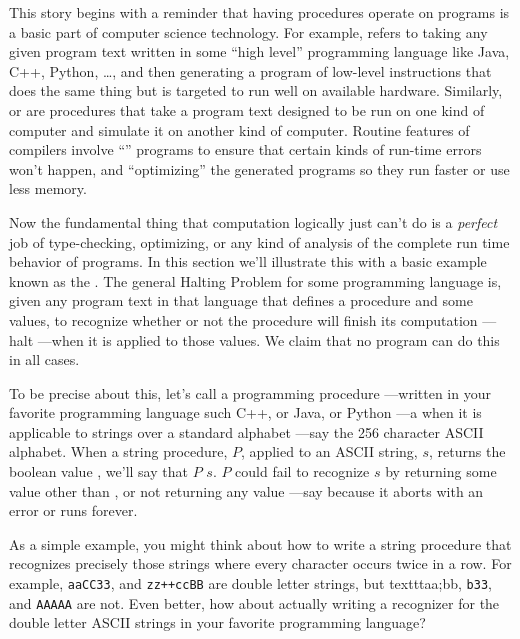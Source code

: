 This story begins with a reminder that having procedures operate on
programs is a basic part of computer science technology.  For example,
\emph{} refers to taking any given program text
written in some ``high level'' programming language like Java, C++,
Python, \dots, and then generating a program of low-level instructions
that does the same thing but is targeted to run well on available
hardware.  Similarly, \emph{} or \emph{} are procedures that take a program text designed to be
run on one kind of computer and simulate it on another kind of
computer.  Routine features of compilers involve
``'' programs to ensure that certain kinds of
run-time errors won't happen, and ``optimizing'' the generated programs
so they run faster or use less memory.

Now the fundamental thing that computation logically just can't do is a
\emph{perfect} job of type-checking, optimizing, or any kind of analysis
of the complete run time behavior of programs.  In this section we'll
illustrate this with a basic example known as the .
The general Halting Problem for some programming language is, given any
program text in that language that defines a procedure and some values, to
recognize whether or not the procedure will finish its computation ---halt
---when it is applied to those values.  We claim that no program can do
this in all cases.

To be precise about this, let's call a programming procedure ---written in
your favorite programming language such C++, or Java, or Python ---a
 when it is applicable to strings over a standard
alphabet ---say the 256 character ASCII alphabet.  When a string
procedure, $P$, applied to an ASCII string, $s$, returns the boolean value
\True, we'll say that $P$  $s$.  $P$ could fail to
recognize $s$ by returning some value other than \True, or not returning
any value ---say because it aborts with an error or runs forever.

As a simple example, you might think about how to write a string procedure
that recognizes precisely those  strings where every
character occurs twice in a row.  For example, \texttt{aaCC33}, and
\texttt{zz++ccBB} are double letter strings, but texttt{aa;bb},
\texttt{b33}, and \texttt{AAAAA} are not.  Even better, how about actually
writing a recognizer for the double letter ASCII strings in your favorite
programming language?

